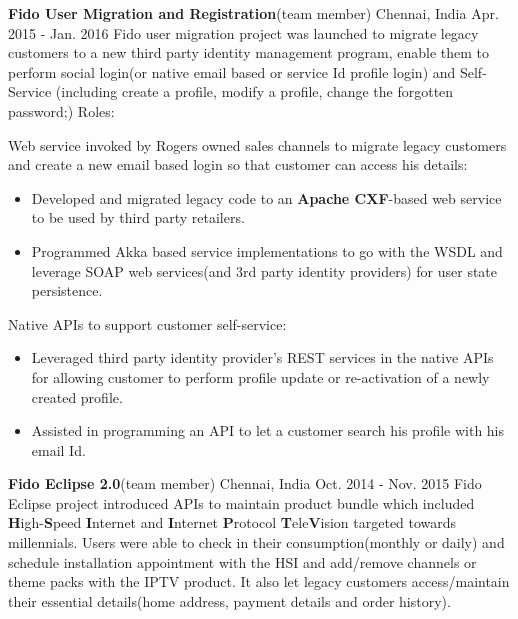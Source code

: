 \begin{cventries}
 
    \experienceentry
    {\textbf{Fido User Migration and Registration}(team member)}
    {}
    {Chennai, India}
    {Apr. 2015 - Jan. 2016}
    {Fido user migration project was launched to migrate legacy customers to a new third party identity management program, enable them to perform social login(or native email based or service Id profile login) and Self-Service (including create a profile, modify a profile, change the forgotten password;)}
    {Roles:}
    {
      \begin{cvitems}
        \item {Web service invoked by Rogers owned sales channels to migrate legacy customers and create a new email based login so that customer can access his details:}
\begin{itemize}
\item Developed and migrated legacy code to an \textbf{Apache CXF}-based web service to be used by third party retailers.
\end{itemize}
\begin{itemize}
\item Programmed Akka based service implementations to go with the WSDL and leverage SOAP web services(and 3rd party identity providers) for user state persistence.
\end{itemize}
        \item {Native APIs to support customer self-service:}
        \begin{itemize}
\item Leveraged third party identity provider's REST services in the native APIs for allowing customer to perform profile update or re-activation of a newly created profile.
\end{itemize}
\begin{itemize}
\item Assisted in programming an API to let a customer search his profile with his email Id.
\end{itemize}
             \end{cvitems}
    }
    \experienceentry
    {\textbf{Fido Eclipse 2.0}(team member)}
    {}
    {Chennai, India}
    {Oct. 2014 - Nov. 2015}
    {Fido Eclipse project introduced APIs to maintain product bundle which included \textbf{H}igh-\textbf{S}peed \textbf{I}nternet and \textbf{I}nternet \textbf{P}rotocol \textbf{T}ele\textbf{V}ision targeted towards millennials. Users were able to check in their consumption(monthly or daily) and schedule installation appointment with the HSI and add/remove channels or theme packs with the IPTV product. It also let legacy customers access/maintain their essential details(home address, payment details and order history). 
}
\end{cventries}
